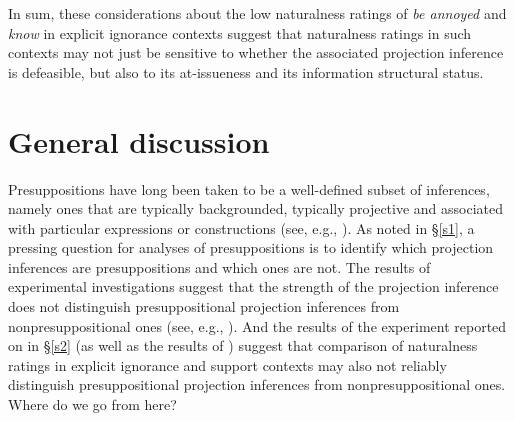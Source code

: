 \documentclass[11pt,fleqn]{article}
\newcommand{\6}{\mbox{$[\hspace*{-.6mm}[$}}
\newcommand{\9}{\mbox{$]\hspace*{-.6mm}]$}}
\begin{document}
In sum, these considerations about the low naturalness ratings of \emph{be annoyed} and \emph{know} in explicit ignorance contexts suggest that naturalness ratings in such contexts may not just be sensitive to whether the associated projection inference is defeasible, but also to its at-issueness and its information structural status. %


  
\section{General discussion}\label{s3}

Presuppositions have long been taken to be a well-defined subset of inferences, namely ones that are typically backgrounded, typically projective and associated with particular expressions or constructions (see, e.g., \citealt{heim83,vds92,potts05,presupposition-sep}). As noted in \S\ref{s1}, a pressing question for analyses of presuppositions is to identify which projection inferences are presuppositions and which ones are not. The results of experimental investigations suggest that the strength of the projection inference does not distinguish presuppositional projection inferences from nonpresuppositional ones (see, e.g., \citealt{demarneffe-etal-sub23,tbd-variability,degen-tonhauser-language}). And the results of the experiment reported on in \S\ref{s2} (as well as the results of \citealt[Exp.~1]{kalomoiros-schwarz2024}) suggest that comparison of naturalness ratings in explicit ignorance and support contexts may also not reliably distinguish presuppositional projection inferences from nonpresuppositional ones. Where do we go from here?
\end{document}

